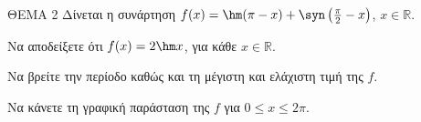 ΘEMA 2
Δίνεται η συνάρτηση $f(x) = \hm (\pi - x) + \syn \left(\frac{\pi}{2} - x\right)$, $x \in \mathbb{R}$.
\begin{alist}
\item Να αποδείξετε ότι $f(x) = 2\hm  x$, για κάθε $x \in \mathbb{R}$.
\item
\begin{rlist}
\item Να βρείτε την περίοδο καθώς και τη μέγιστη και ελάχιστη τιμή της $f$.
\item Να κάνετε τη γραφική παράσταση της $f$ για $0 \le x \le 2\pi$.
\end{rlist}
\end{alist}

